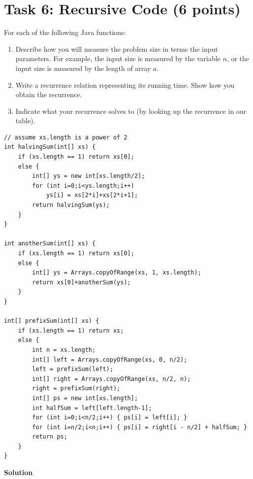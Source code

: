 \documentclass{article}
\newcommand{\solution}{\textbf{\large Solution}}
\theoremstyle{remark}
\begin{document}
\vspace{1em}
\hrulefill

\section*{Task 6: Recursive Code (6 points)}

For each of the following Java functions:

\begin{enumerate}
    \item Describe how you will measure the problem size in terms the input parameters. For example, the input size is measured by the variable $n$, or the input size is measured by the length of array $a$.
    \item Write a recurrence relation representing its running time. Show how you obtain the recurrence.
    \item Indicate what your recurrence solves to (by looking up the recurrence in our table).
\end{enumerate}

\begin{verbatim}
// assume xs.length is a power of 2
int halvingSum(int[] xs) {
    if (xs.length == 1) return xs[0];
    else {
        int[] ys = new int[xs.length/2];
        for (int i=0;i<ys.length;i++)
            ys[i] = xs[2*i]+xs[2*i+1];
        return halvingSum(ys);
    }
}

int anotherSum(int[] xs) {
    if (xs.length == 1) return xs[0];
    else {
        int[] ys = Arrays.copyOfRange(xs, 1, xs.length);
        return xs[0]+anotherSum(ys);
    }
}

int[] prefixSum(int[] xs) {
    if (xs.length == 1) return xs;
    else {
        int n = xs.length;
        int[] left = Arrays.copyOfRange(xs, 0, n/2);
        left = prefixSum(left);
        int[] right = Arrays.copyOfRange(xs, n/2, n);
        right = prefixSum(right);
        int[] ps = new int[xs.length];
        int halfSum = left[left.length-1];
        for (int i=0;i<n/2;i++) { ps[i] = left[i]; }
        for (int i=n/2;i<n;i++) { ps[i] = right[i - n/2] + halfSum; }
        return ps;
    }
}
\end{verbatim}

\medskip
\solution
\end{document}
